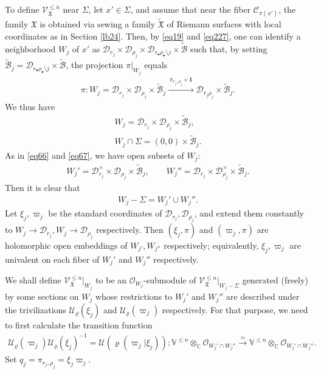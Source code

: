 \documentclass[12pt,b5paper,notitlepage]{report}
\theoremstyle{definition}
\theoremstyle{plain}
\newcommand{\fk}{\mathfrak}
\newcommand{\mc}{\mathcal}
\newcommand{\wtd}{\widetilde}
\newcommand{\id}{\mathbf{1}}
\newcommand{\scr}{\mathscr}
\newcommand{\Vbb}{\mathbb V}
\newcommand{\Cbb}{\mathbb C}
\numberwithin{equation}{section}
\begin{document}
To define $\scr V_{\fk X}^{\leq n}$ near $\Sigma$, let $x'\in\Sigma$, and assume that near the fiber $\mc C_{\pi(x')}$, the family $\fk X$ is obtained via sewing  a family $\wtd{\fk X}$ of Riemann surfaces with local coordinates  as in Section \ref{lb24}. Then, by \eqref{eq19} and \eqref{eq227}, one can identify a neighborhood $W_j$ of $x'$ as $\mc D_{r_j}\times\mc D_{\rho_j}\times\mc D_{r_\bullet\rho_\bullet\setminus j}\times\wtd{\mc B}$ such that, by setting $\wtd {\mc B}_j=\mc D_{r_\bullet\rho_\bullet\setminus j}\times\wtd{\mc B}$, the projection $\pi|_{W_j}$ equals
\begin{align}
\pi:W_j=\mc D_{r_j}\times\mc D_{\rho_j}\times\wtd{\mc B}_j\xrightarrow{~\pi_{r_j,\rho_j}\times\id~} \mc D_{r_j\rho_j}\times\wtd{\mc B}_j.\label{eq69}
\end{align}
We thus have
\begin{gather}
W_j=\mc D_{r_j}\times\mc D_{\rho_j}\times\wtd{\mc B}_j,\label{eq115}\\
W_j\cap\Sigma=(0,0)\times\wtd{\mc B}_j.\nonumber
\end{gather}
As in \eqref{eq66} and \eqref{eq67}, we have open subsets of $W_j$:
\begin{gather*}
W_j'=\mc D_{r_j}^\times\times\mc D_{\rho_j}\times\wtd{\mc B}_j,\qquad W_j''=\mc D_{r_j}\times\mc D_{\rho_j}^\times\times\wtd{\mc B}_j.
\end{gather*}
Then it is clear that
\begin{align*}
W_j-\Sigma=W_j'\cup W_j''.
\end{align*}
Let $\xi_j,\varpi_j$ be the standard coordinates of $\mc D_{r_j},\mc D_{\rho_j}$, and extend them constantly to $W_j\rightarrow\mc D_{r_j},W_j\rightarrow\mc D_{\rho_j}$ respectively. Then $(\xi_j,\pi)$ and $(\varpi_j,\pi)$ are holomorphic open embeddings of $W_{j'},W_{j''}$ respectively; equivalently, $\xi_j,\varpi_j$ are univalent on each fiber of $W_j'$ and $W_j''$ respectively.



We shall define $\scr V^{\leq n}_{\fk X}|_{W_j}$ to be an $\scr O_{W_j}$-submodule of $\scr V_{\fk X}^{\leq n}|_{W_j-\Sigma}$ generated (freely) by some sections on $W_j$ whose restrictions to $W_j'$ and $W_j''$ are described under the trivilizations $\mc U_\varrho(\xi_j)$ and $\mc U_\varrho(\varpi_j)$ respectively. For that purpose, we need to first calculate the transition function \begin{align*}
\mc U_\varrho(\varpi_j)\mc U_\varrho(\xi_j)^{-1}=\mc U(\varrho(\varpi_j|\xi_j)):\Vbb^{\leq n}\otimes_{\Cbb}\scr O_{W_j'\cap W_j''}\xrightarrow{\simeq} \Vbb^{\leq n}\otimes_{\Cbb}\scr O_{W_j'\cap W_j''}.
\end{align*}
Set $q_j=\pi_{r_j,\rho_j}=\xi_j\varpi_j$. 
\end{document}

